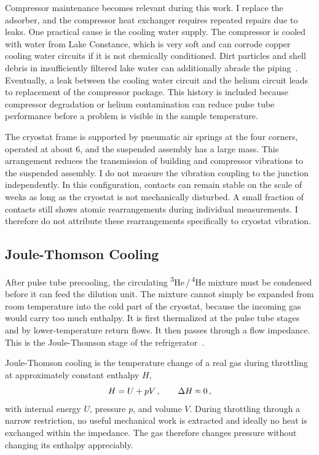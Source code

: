         Compressor maintenance becomes relevant during this work. I replace the adsorber, and the compressor heat exchanger requires repeated repairs due to leaks. One practical cause is the cooling water supply. The compressor is cooled with water from Lake Constance, which is very soft and can corrode copper cooling water circuits if it is not chemically conditioned. Dirt particles and shell debris in insufficiently filtered lake water can additionally abrade the piping~\cite{haltiner_distribution_2022}. Eventually, a leak between the cooling water circuit and the helium circuit leads to replacement of the compressor package. This history is included because compressor degradation or helium contamination can reduce pulse tube performance before a problem is visible in the sample temperature.

        The cryostat frame is supported by pneumatic air springs at the four corners, operated at about \qty{6}{\barunit}, and the suspended assembly has a large mass. This arrangement reduces the transmission of building and compressor vibrations to the suspended assembly. I do not measure the vibration coupling to the junction independently. In this configuration, contacts can remain stable on the scale of weeks as long as the cryostat is not mechanically disturbed. A small fraction of contacts still shows atomic rearrangements during individual measurements. I therefore do not attribute these rearrangements specifically to cryostat vibration.

    \subsection*{Joule-Thomson Cooling}

        After pulse tube precooling, the circulating \textsuperscript{3}He\,/\,\textsuperscript{4}He mixture must be condensed before it can feed the dilution unit. The mixture cannot simply be expanded from room temperature into the cold part of the cryostat, because the incoming gas would carry too much enthalpy. It is first thermalized at the pulse tube stages and by lower-temperature return flows. It then passes through a flow impedance. This is the Joule-Thomson stage of the refrigerator~\cite{de_waele_basic_2011,pobell_matter_2007}.

        Joule-Thomson cooling is the temperature change of a real gas during throttling at approximately constant enthalpy $H$,
        \begin{equation}
            H = U + pV\,,\qquad \Delta H \sapprox 0\,,
            \label{eq:setup:jt-enthalpy}
        \end{equation}
        with internal energy $U$, pressure $p$, and volume $V$. During throttling through a narrow restriction, no useful mechanical work is extracted and ideally no heat is exchanged within the impedance. The gas therefore changes pressure without changing its enthalpy appreciably.

